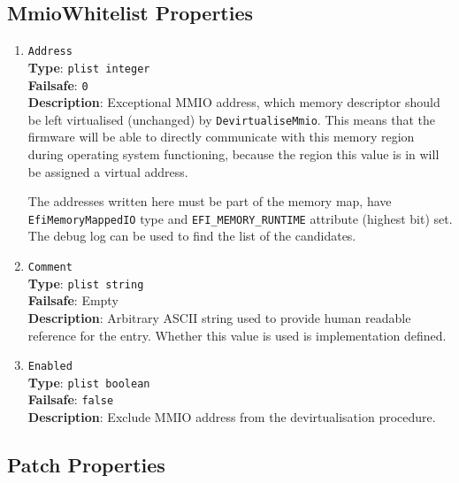 \documentclass[]{article}
\begin{document}
\subsection{MmioWhitelist Properties}\label{booterpropsmmio}

\begin{enumerate}

\item
  \texttt{Address}\\
  \textbf{Type}: \texttt{plist\ integer}\\
  \textbf{Failsafe}: \texttt{0}\\
  \textbf{Description}: Exceptional MMIO address, which memory descriptor should be left
  virtualised (unchanged) by \texttt{DevirtualiseMmio}. This means that the firmware will
  be able to directly communicate with this memory region during operating system functioning,
  because the region this value is in will be assigned a virtual address.

  The addresses written here must be part of the memory map, have \texttt{EfiMemoryMappedIO}
  type and \texttt{EFI\_MEMORY\_RUNTIME} attribute (highest bit) set. The debug log can be used
  to find the list of the candidates.

\item
  \texttt{Comment}\\
  \textbf{Type}: \texttt{plist\ string}\\
  \textbf{Failsafe}: Empty\\
  \textbf{Description}: Arbitrary ASCII string used to provide human readable
  reference for the entry. Whether this value is used is implementation defined.

\item
  \texttt{Enabled}\\
  \textbf{Type}: \texttt{plist\ boolean}\\
  \textbf{Failsafe}: \texttt{false}\\
  \textbf{Description}: Exclude MMIO address from the devirtualisation procedure.

\end{enumerate}

\subsection{Patch Properties}\label{booterpropspatch}
\end{document}
